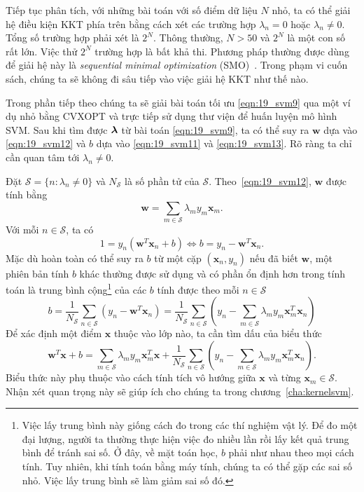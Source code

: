 Tiếp tục phân tích, với những bài toán với số điểm dữ liệu $N$ nhỏ, ta có thể
giải hệ điều kiện KKT phía trên bằng cách xét các trường hợp $\lambda_n = 0$
hoặc $\lambda_n \neq 0$. Tổng số trường hợp phải xét là $2^N$. Thông thường, $N
> 50$ và $2^N$ là một con số rất lớn. Việc thử $2^N$ trường hợp là bất khả thi.
Phương pháp thường được dùng để giải hệ này là \textit{sequential minimal
optimization} (SMO)~\cite{platt1998sequential,zeng2008fast}. Trong phạm vi cuốn
sách, chúng ta sẽ không đi sâu tiếp vào việc giải hệ KKT như thế nào.

Trong phần tiếp
theo chúng ta sẽ giải bài toán tối ưu \eqref{eqn:19_svm9} qua một ví dụ nhỏ bằng CVXOPT và trực tiếp sử dụng thư viện  để huấn luyện mô hình SVM.
Sau khi tìm được $\boldsymbol{\lambda}$ từ bài toán \eqref{eqn:19_svm9}, ta có thể suy ra $\mathbf{w}$ dựa vào \eqref{eqn:19_svm12} và $b$ dựa vào
\eqref{eqn:19_svm11} và \eqref{eqn:19_svm13}. Rõ ràng ta chỉ cần quan tâm tới
$\lambda_n \neq 0$.

Đặt $\mathcal{S} = \{n: \lambda_n \neq 0\}$ và $N_{\mathcal{S}}$ là số
phần tử của $\mathcal{S}$. Theo~\eqref{eqn:19_svm12}, $\mathbf{w}$ được tính bằng
\begin{equation}
\label{eqn:19_}
\mathbf{w} = \sum_{m \in \mathcal{S}} \lambda_m y_m \mathbf{x}_m.
\end{equation}
Với mỗi $n \in \mathcal{S}$, ta có
\begin{equation*}
1 = y_n(\mathbf{w}^T\mathbf{x}_n + b) \Leftrightarrow b = y_n  - \mathbf{w}^T\mathbf{x}_n.
\end{equation*}
Mặc dù hoàn toàn có thể suy ra $b$ từ một cặp $(\mathbf{x}_n, y_n)$
nếu đã biết $\mathbf{w}$, một phiên bản tính $b$ khác thường được sử dụng và có phần {ổn định hơn trong tính toán}
là trung bình cộng\footnote{Việc lấy trung bình này giống cách đo trong các thí
nghiệm vật lý. Để đo một đại lượng, người ta thường thực hiện việc đo nhiều lần
rồi lấy kết quả trung bình để tránh sai số. Ở đây, về mặt toán học, $b$ phải như
nhau theo mọi cách tính. Tuy nhiên, khi tính toán bằng máy tính, chúng ta có thể
gặp các sai số nhỏ. Việc lấy trung bình sẽ làm giảm sai số đó.}  của các
$b$ tính được theo mỗi $n \in
\mathcal{S}$
\begin{equation}
\label{eqn:19_svm15}
b = \frac{1}{N_{\mathcal{S}}} \sum_{n \in \mathcal{S}}(y_n - \mathbf{w}^T\mathbf{x}_n) =
\frac{1}{N_{\mathcal{S}}} \sum_{n \in \mathcal{S}} \left(y_n - \sum_{m\in
\mathcal{S}} \lambda_m y_m \mathbf{x}_m^T \mathbf{x}_n\right)
\end{equation}
Để xác định một điểm $\mathbf{x}$ thuộc vào lớp nào, ta cần tìm dấu
của biểu thức
\begin{equation*}
\mathbf{w}^T\mathbf{x} + b = \sum_{m \in \mathcal{S}} \lambda_m y_m
\mathbf{x}_m^T \mathbf{x} + \frac{1}{N_{\mathcal{S}}} \sum_{n \in \mathcal{S}}
\left(y_n - \sum_{m\in \mathcal{S}} \lambda_m y_m \mathbf{x}_m^T \mathbf{x}_n\right).
\end{equation*}
Biểu thức này phụ thuộc vào cách tính tích vô hướng giữa $\mathbf{x}$ và từng
$\mathbf{x}_m \in \mathcal{S}$. Nhận xét quan trọng này sẽ giúp ích cho chúng ta
trong chương~\ref{cha:kernelsvm}.


